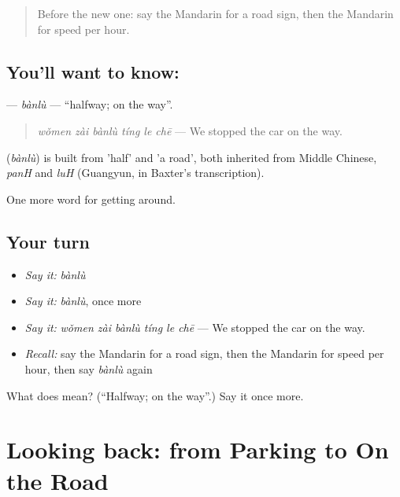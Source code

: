 \begin{quote}
Before the new one: say the Mandarin for a road sign, then the Mandarin for speed per hour.
\end{quote}

\subsection*{You'll want to know: }
\textbf{} — \emph{bànlù} — \textquotedblleft{}halfway; on the way\textquotedblright{}.

\begin{quote}
\textbf{} \emph{wǒmen zài bànlù tíng le chē} — We stopped the car on the way.
\end{quote}

\begin{cousinweb}
\textbf{} (\emph{bànlù}) is built from  'half' and  'a road', both inherited from Middle Chinese, \emph{panH} and \emph{luH} (Guangyun, in Baxter's transcription).
\end{cousinweb}

\begin{grammarlens}[title={What you've built}]
One more word for getting around.
\end{grammarlens}

\subsection*{Your turn}
\begin{itemize}
\raggedright
  \item \emph{Say it:} \emph{bànlù}
  \item \emph{Say it:} \emph{bànlù}, once more
  \item \emph{Say it:} \emph{wǒmen zài bànlù tíng le chē} — We stopped the car on the way.
  \item \emph{Recall:} say the Mandarin for a road sign, then the Mandarin for speed per hour, then say \emph{bànlù} again
\end{itemize}

\begin{tcolorbox}[breakable,colback=teal!4,colframe=teal!35!black,title={Before you move on}]
What does  mean? (\textquotedblleft{}Halfway; on the way\textquotedblright{}.) Say it once more.
\end{tcolorbox}
\section[(dialogue)]{Looking back: from Parking to On the Road}

